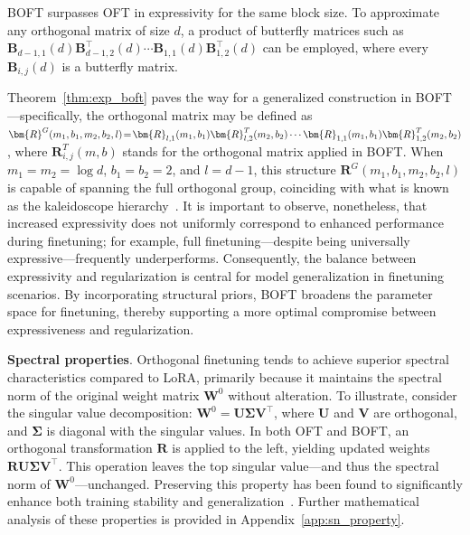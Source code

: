 \begin{theorem}\label{thm:exp_boft}
    BOFT surpasses OFT in expressivity for the same block size. To approximate any orthogonal matrix of size $d$, a product of butterfly matrices such as $\bm{B}_{d-1,1}(d)\bm{B}^\top_{d-1,2}(d)\cdots\bm{B}_{1,1}(d)\bm{B}^\top_{1,2}(d)$ can be employed, where every $\bm{B}_{i,j}(d)$ is a butterfly matrix.
\end{theorem}

Theorem~\ref{thm:exp_boft} paves the way for a generalized construction in BOFT—specifically, the orthogonal matrix may be defined as $\thickmuskip=2mu \medmuskip=2mu \bm{R}^G(m_1,b_1,m_2,b_2,l)=\bm{R}_{l,1}(m_1,b_1)\bm{R}_{l,2}^T(m_2,b_2)\cdots\bm{R}_{1,1}(m_1,b_1)\bm{R}_{1,2}^T(m_2,b_2)$, where $\bm{R}_{i,j}^T(m,b)$ stands for the orthogonal matrix applied in BOFT. When $m_1=m_2=\log d$, $b_1=b_2=2$, and $l=d-1$, this structure $\bm{R}^G(m_1,b_1,m_2,b_2,l)$ is capable of spanning the full orthogonal group, coinciding with what is known as the kaleidoscope hierarchy~\cite{dao2019kaleidoscope}. It is important to observe, nonetheless, that increased expressivity does not uniformly correspond to enhanced performance during finetuning; for example, full finetuning—despite being universally expressive—frequently underperforms. Consequently, the balance between expressivity and regularization is central for model generalization in finetuning scenarios. By incorporating structural priors, BOFT broadens the parameter space for finetuning, thereby supporting a more optimal compromise between expressiveness and regularization.

\textbf{Spectral properties}. Orthogonal finetuning tends to achieve superior spectral characteristics compared to LoRA, primarily because it maintains the spectral norm of the original weight matrix $\bm{W}^0$ without alteration. To illustrate, consider the singular value decomposition: $\bm{W}^0=\bm{U}\bm{\Sigma}\bm{V}^\top$, where $\bm{U}$ and $\bm{V}$ are orthogonal, and $\bm{\Sigma}$ is diagonal with the singular values. In both OFT and BOFT, an orthogonal transformation $\bm{R}$ is applied to the left, yielding updated weights $\bm{R}\bm{U}\bm{\Sigma}\bm{V}^\top$. This operation leaves the top singular value—and thus the spectral norm of $\bm{W}^0$—unchanged. Preserving this property has been found to significantly enhance both training stability and generalization~\cite{miyato2018spectral,yoshida2017spectral}. Further mathematical analysis of these properties is provided in Appendix~\ref{app:sn_property}.

